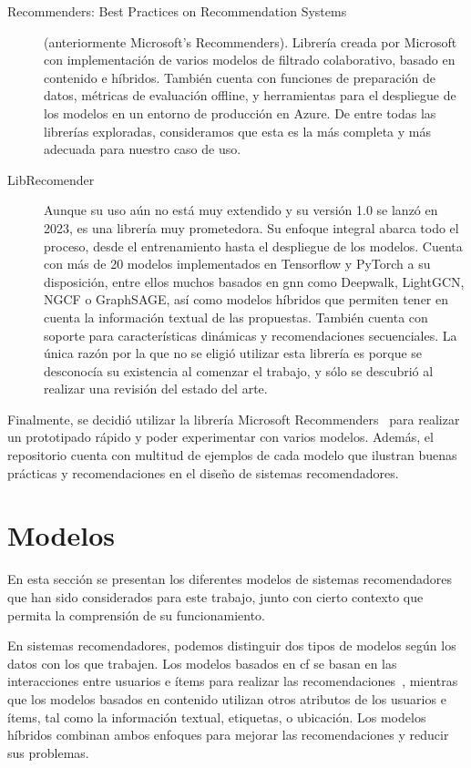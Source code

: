 \begin{description}
    \item [Recommenders: Best Practices on Recommendation Systems~\cite{argyriou_microsoft_2020}] (anteriormente Microsoft's Recommenders). Librería creada por Microsoft con implementación de varios modelos de filtrado colaborativo, basado en contenido e híbridos. También cuenta con funciones de preparación de datos, métricas de evaluación offline, y herramientas para el despliegue de los modelos en un entorno de producción en Azure. De entre todas las librerías exploradas, consideramos que esta es la más completa y más adecuada para nuestro caso de uso.
    \item [LibRecomender~\cite{massquantity_librecommender_2020}] Aunque su uso aún no está muy extendido y su versión 1.0 se lanzó en 2023, es una librería muy prometedora. Su enfoque integral abarca todo el proceso, desde el entrenamiento hasta el despliegue de los modelos. Cuenta con más de 20 modelos implementados en Tensorflow y PyTorch a su disposición, entre ellos muchos basados en \acrshort{gnn} como Deepwalk, LightGCN, NGCF o GraphSAGE, así como modelos híbridos que permiten tener en cuenta la información textual de las propuestas. También cuenta con soporte para características dinámicas y recomendaciones secuenciales. La única razón por la que no se eligió utilizar esta librería es porque se desconocía su existencia al comenzar el trabajo, y sólo se descubrió al realizar una revisión del estado del arte.
\end{description}

Finalmente, se decidió utilizar la librería Microsoft Recommenders~\cite{argyriou_microsoft_2020} para realizar un prototipado rápido y poder experimentar con varios modelos. Además, el repositorio cuenta con multitud de ejemplos de cada modelo que ilustran buenas prácticas y recomendaciones en el diseño de sistemas recomendadores.

\section{Modelos}

En esta sección se presentan los diferentes modelos de sistemas recomendadores que han sido considerados para este trabajo, junto con cierto contexto que permita la comprensión de su funcionamiento.

En sistemas recomendadores, podemos distinguir dos tipos de modelos según los datos con los que trabajen. Los modelos basados en \acrfull{cf} se basan en las interacciones entre usuarios e ítems para realizar las recomendaciones~\cite{aggarwal_recommender_2016}, mientras que los modelos basados en contenido utilizan otros atributos de los usuarios e ítems, tal como la información textual, etiquetas, o ubicación. Los modelos híbridos combinan ambos enfoques para mejorar las recomendaciones y reducir sus problemas.

